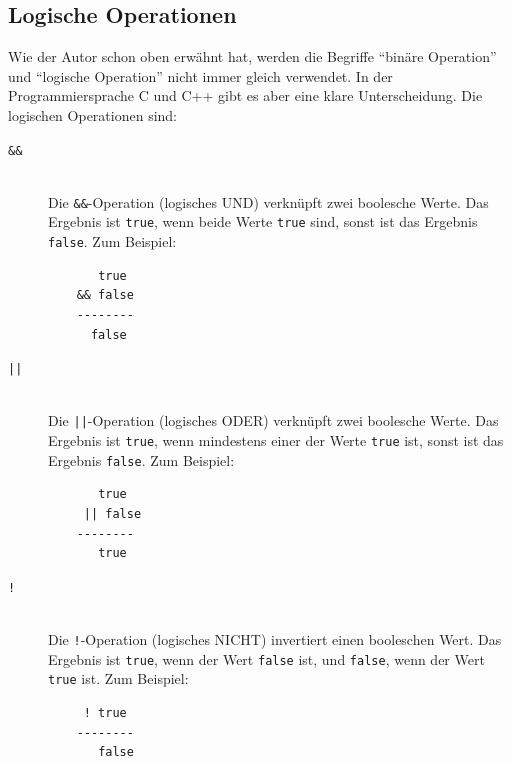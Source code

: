 \subsection{Logische Operationen}
\label{sec:etwas-mathematik:logische-operationen}

Wie der Autor schon oben erwähnt hat, werden die Begriffe ``binäre Operation'' und ``logische Operation'' nicht immer gleich verwendet. In der Programmiersprache C und C++ gibt es aber eine klare Unterscheidung. Die logischen Operationen sind:
\begin{description}
  \item[\texttt{\&\&}]\hfill\\
    Die \texttt{\&\&}-Operation (logisches UND) verknüpft zwei boolesche Werte. Das Ergebnis ist \texttt{true}, wenn beide Werte \texttt{true} sind, sonst ist das Ergebnis \texttt{false}. Zum Beispiel:
    \begin{lstlisting}
       true
    && false
    --------
      false
    \end{lstlisting}
  \item[\texttt{||}]\hfill\\
    Die \texttt{||}-Operation (logisches ODER) verknüpft zwei boolesche Werte. Das Ergebnis ist \texttt{true}, wenn mindestens einer der Werte \texttt{true} ist, sonst ist das Ergebnis \texttt{false}. Zum Beispiel:
    \begin{lstlisting}
       true
     || false
    --------
       true
    \end{lstlisting}
  \item[\texttt{!}]\hfill\\
    Die \texttt{!}-Operation (logisches NICHT) invertiert einen booleschen Wert. Das Ergebnis ist \texttt{true}, wenn der Wert \texttt{false} ist, und \texttt{false}, wenn der Wert \texttt{true} ist. Zum Beispiel:
    \begin{lstlisting}
     ! true
    --------
       false
    \end{lstlisting}
\end{description}